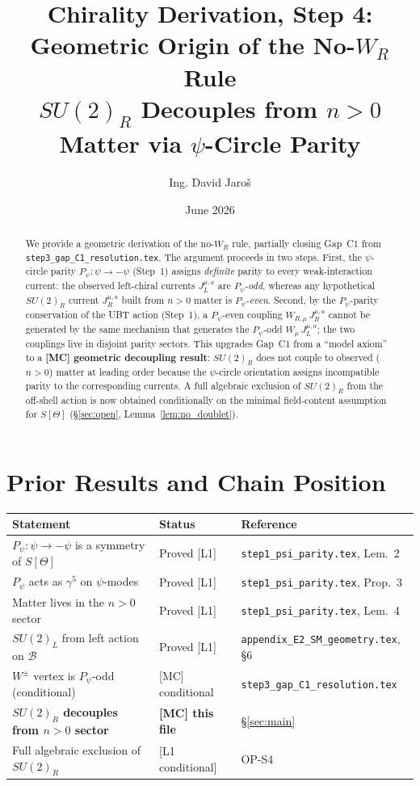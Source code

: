 \documentclass[12pt,a4paper]{article}
\title{\textbf{Chirality Derivation, Step 4: Geometric Origin of the No-$W_R$ Rule}\\
       \large $SU(2)_R$ Decouples from $n>0$ Matter via $\psi$-Circle Parity}
\author{Ing. David Jaroš}
\date{June 2026}
\theoremstyle{definition}
\theoremstyle{remark}
\begin{document}
\maketitle

\begin{abstract}
We provide a geometric derivation of the no-$W_R$ rule, partially closing Gap~C1
from \texttt{step3\_gap\_C1\_resolution.tex}.
The argument proceeds in two steps.
First, the $\psi$-circle parity $P_\psi:\psi\to-\psi$ (Step~1) assigns
\emph{definite} parity to every weak-interaction current:
the observed left-chiral currents $J^{\mu,a}_L$ are $P_\psi$-\emph{odd},
whereas any hypothetical $SU(2)_R$ current $J^{\mu,a}_R$ built from
$n>0$ matter is $P_\psi$-\emph{even}.
Second, by the $P_\psi$-parity conservation of the UBT action (Step~1),
a $P_\psi$-even coupling $W_{R,\mu}\,J^{\mu,a}_R$ cannot be generated by
the same mechanism that generates the $P_\psi$-odd $W_\mu\,J^{\mu,a}_L$;
the two couplings live in disjoint parity sectors.
This upgrades Gap~C1 from a ``model axiom'' to a
\textbf{[MC] geometric decoupling result}:
$SU(2)_R$ does not couple to observed ($n>0$) matter at leading order
because the $\psi$-circle orientation assigns incompatible parity to the
corresponding currents.
A full algebraic exclusion of $SU(2)_R$ from the off-shell action is now
obtained conditionally on the minimal field-content assumption for $S[\Theta]$
(§\ref{sec:open}, Lemma~\ref{lem:no_doublet}).
\end{abstract}
\fi

\section{Prior Results and Chain Position}
\label{sec:prior}

\begin{center}
\begin{tabular}{lll}
  \toprule
  \textbf{Statement} & \textbf{Status} & \textbf{Reference} \\
  \midrule
  $P_\psi:\psi\to-\psi$ is a symmetry of $S[\Theta]$ & Proved [L1] &
    \texttt{step1\_psi\_parity.tex}, Lem.~2 \\
  $P_\psi$ acts as $\gamma^5$ on $\psi$-modes & Proved [L1] &
    \texttt{step1\_psi\_parity.tex}, Prop.~3 \\
  Matter lives in the $n>0$ sector & Proved [L1] &
    \texttt{step1\_psi\_parity.tex}, Lem.~4 \\
  $SU(2)_L$ from left action on $\mathcal{B}$ & Proved [L1] &
    \texttt{appendix\_E2\_SM\_geometry.tex}, §6 \\
  $W^\pm$ vertex is $P_\psi$-odd (conditional) & [MC] conditional &
    \texttt{step3\_gap\_C1\_resolution.tex} \\
  \textbf{$SU(2)_R$ decouples from $n>0$ sector} &
    \textbf{[MC] this file} & §\ref{sec:main} \\
  Full algebraic exclusion of $SU(2)_R$ & [L1 conditional] & OP-S4 \\
  \bottomrule
\end{tabular}
\end{center}
\end{document}
